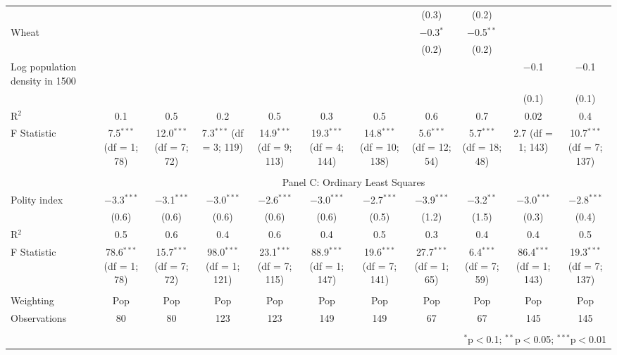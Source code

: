 {\begin{table}[]
\begin{threeparttable}
\begin{tabular}{@{\extracolsep{0pt}}lcccccccccc}
  &  &  &  &  &  &  & (0.3) & (0.2) &  &  \\ 
  Wheat &  &  &  &  &  &  & $-$0.3$^{*}$ & $-$0.5$^{**}$ &  &  \\ 
  &  &  &  &  &  &  & (0.2) & (0.2) &  &  \\ 
  Log population density in 1500 &  &  &  &  &  &  &  &  & $-$0.1 & $-$0.1 \\ 
  &  &  &  &  &  &  &  &  & (0.1) & (0.1) \\ 
  R$^{2}$ & 0.1 & 0.5 & 0.2 & 0.5 & 0.3 & 0.5 & 0.6 & 0.7 & 0.02 & 0.4 \\ 
F Statistic & 7.5$^{***}$ (df = 1; 78) & 12.0$^{***}$ (df = 7; 72) & 7.3$^{***}$ (df = 3; 119) & 14.9$^{***}$ (df = 9; 113) & 19.3$^{***}$ (df = 4; 144) & 14.8$^{***}$ (df = 10; 138) & 5.6$^{***}$ (df = 12; 54) & 5.7$^{***}$ (df = 18; 48) & 2.7 (df = 1; 143) & 10.7$^{***}$ (df = 7; 137) \\ 
\hline  \\[-1.8ex] 
   & \multicolumn{10}{c}{Panel C: Ordinary Least Squares} \\
Polity index & $-$3.3$^{***}$ & $-$3.1$^{***}$ & $-$3.0$^{***}$ & $-$2.6$^{***}$ & $-$3.0$^{***}$ & $-$2.7$^{***}$ & $-$3.9$^{***}$ & $-$3.2$^{**}$ & $-$3.0$^{***}$ & $-$2.8$^{***}$ \\ 
  & (0.6) & (0.6) & (0.6) & (0.6) & (0.6) & (0.5) & (1.2) & (1.5) & (0.3) & (0.4) \\ 
R$^{2}$ & 0.5 & 0.6 & 0.4 & 0.6 & 0.4 & 0.5 & 0.3 & 0.4 & 0.4 & 0.5 \\ 
F Statistic & 78.6$^{***}$ (df = 1; 78) & 15.7$^{***}$ (df = 7; 72) & 98.0$^{***}$ (df = 1; 121) & 23.1$^{***}$ (df = 7; 115) & 88.9$^{***}$ (df = 1; 147) & 19.6$^{***}$ (df = 7; 141) & 27.7$^{***}$ (df = 1; 65) & 6.4$^{***}$ (df = 7; 59) & 86.4$^{***}$ (df = 1; 143) & 19.3$^{***}$ (df = 7; 137)  \\ 
  \hline \\[-1.8ex] 
Weighting & Pop & Pop & Pop & Pop & Pop & Pop & Pop & Pop & Pop & Pop \\ 
Observations & 80 & 80 & 123 & 123 & 149 & 149 & 67 & 67 & 145 & 145 \\ 
\hline 
\hline \\[-1.8ex] 
 & \multicolumn{10}{r}{$^{*}$p$<$0.1; $^{**}$p$<$0.05; $^{***}$p$<$0.01} \\ 
\end{tabular} 
\begin{tablenotes} 

\end{tablenotes}
\end{threeparttable}
\end{table}}
